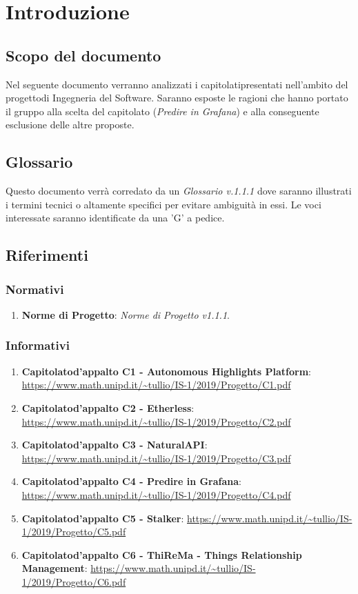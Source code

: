 \section{Introduzione}
\subsection{Scopo del documento}
    Nel seguente documento verranno analizzati i capitolati\glosp presentati nell'ambito del progetto\glosp di Ingegneria del Software. Saranno esposte le ragioni che hanno portato il gruppo alla scelta del capitolato (\textit{Predire in Grafana}) e alla conseguente esclusione delle altre proposte.
\subsection{Glossario}
    Questo documento verrà corredato da un \textit{Glossario v.1.1.1} dove saranno illustrati i termini tecnici o altamente specifici per evitare ambiguità in essi. Le voci interessate saranno identificate da una 'G' a pedice.
\subsection{Riferimenti}
\subsubsection{Normativi}
\begin{enumerate}
	\item \textbf{Norme di Progetto}: \textit{Norme di Progetto v1.1.1}.
\end{enumerate}
\subsubsection{Informativi}
\begin{enumerate}
    \item \textbf{Capitolato}\glosp \textbf{d'appalto C1 - Autonomous Highlights Platform}:  \url{https://www.math.unipd.it/~tullio/IS-1/2019/Progetto/C1.pdf}
    \item \textbf{Capitolato}\glosp \textbf{d'appalto C2 - Etherless}:  \url{https://www.math.unipd.it/~tullio/IS-1/2019/Progetto/C2.pdf}
    \item \textbf{Capitolato}\glosp \textbf{d'appalto C3 - NaturalAPI}:  \url{https://www.math.unipd.it/~tullio/IS-1/2019/Progetto/C3.pdf}
    \item \textbf{Capitolato}\glosp \textbf{d'appalto C4 - Predire in Grafana}:  \url{https://www.math.unipd.it/~tullio/IS-1/2019/Progetto/C4.pdf}
    \item \textbf{Capitolato}\glosp \textbf{d'appalto C5 - Stalker}:  \url{https://www.math.unipd.it/~tullio/IS-1/2019/Progetto/C5.pdf}
    \item \textbf{Capitolato}\glosp \textbf{d'appalto C6 - ThiReMa - Things Relationship Management}: \url{https://www.math.unipd.it/~tullio/IS-1/2019/Progetto/C6.pdf}
\end{enumerate}
